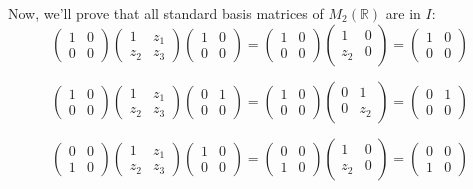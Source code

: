 \documentclass{article}
\begin{document}
\hfill

Now, we'll prove that all standard basis matrices of $M_2(\mathbb{R})$ are in $I$:
$$\begin{pmatrix}
    1&0\\0&0
\end{pmatrix}
\begin{pmatrix}
    1&z_1\\z_2&z_3
\end{pmatrix}\begin{pmatrix}
    1&0\\0&0
\end{pmatrix}=\begin{pmatrix}
    1&0\\0&0
\end{pmatrix}
\begin{pmatrix}
    1&0\\z_2&0
\end{pmatrix}=\begin{pmatrix}
    1&0\\0&0
\end{pmatrix}$$

$$\begin{pmatrix}
    1&0\\0&0
\end{pmatrix}
\begin{pmatrix}
    1&z_1\\z_2&z_3
\end{pmatrix}\begin{pmatrix}
    0&1\\0&0
\end{pmatrix}=\begin{pmatrix}
    1&0\\0&0
\end{pmatrix}
\begin{pmatrix}
    0&1\\0&z_2
\end{pmatrix}=\begin{pmatrix}
    0&1\\0&0
\end{pmatrix}$$

$$\begin{pmatrix}
    0&0\\1&0
\end{pmatrix}
\begin{pmatrix}
    1&z_1\\z_2&z_3
\end{pmatrix}\begin{pmatrix}
    1&0\\0&0
\end{pmatrix}=\begin{pmatrix}
    0&0\\1&0
\end{pmatrix}
\begin{pmatrix}
    1&0\\z_2&0
\end{pmatrix}=\begin{pmatrix}
    0&0\\1&0
\end{pmatrix}$$
\end{document}
